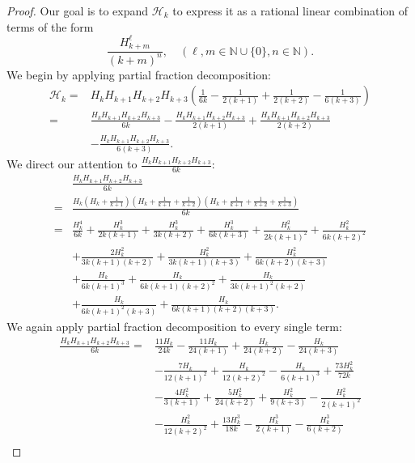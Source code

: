 \documentclass[10pt]{amsart}
\theoremstyle{definition}
\begin{document}
\begin{proof}
    Our goal is to expand $\mathscr{H}_k$ to express it as a rational linear combination of terms of the form $$\frac{H_{k+m}^\ell}{(k+m)^n}, \quad (\ell, m \in \mathbb{N}\cup\{0\}, n \in \mathbb{N}).$$
    We begin by applying partial fraction decomposition:
    \begin{align*}
        \mathscr{H}_k
        =& H_k H_{k+1} H_{k+2} H_{k+3}\left(\frac{1}{6 k} - \frac{1}{2 (k+1)} + \frac{1}{2 (k+2)} - \frac{1}{6 (k+3)}\right)\\
        =& \frac{H_k H_{k+1} H_{k+2} H_{k+3}}{6k} - \frac{H_k H_{k+1} H_{k+2} H_{k+3}}{2 (k+1)} + \frac{H_k H_{k+1} H_{k+2} H_{k+3}}{2 (k+2)}\\
        &- \frac{H_k H_{k+1} H_{k+2} H_{k+3}}{6 (k+3)}.
    \end{align*}
    We direct our attention to $\frac{H_k H_{k+1} H_{k+2} H_{k+3}}{6k}$:
    \begin{align*}
        &\frac{H_k H_{k+1} H_{k+2} H_{k+3}}{6k}\\
        =& \frac{H_k\left(H_k + \frac{1}{k+1}\right)\left(H_k + \frac{1}{k+1} + \frac{1}{k+2}\right)\left(H_k + \frac{1}{k+1} + \frac{1}{k+2} + \frac{1}{k+3}\right)}{6k}\\
        =& \frac{H_k^4}{6 k} + \frac{H_k^3}{2 k (k+1)} +  \frac{H_k^3}{3 k (k+2)} +  \frac{H_k^3}{6 k (k+3)} + \frac{H_k^2}{2k (k+1)^2} + \frac{H_k^2}{6k (k+2)^2}\\
        &+ \frac{2 H_k^2}{3 k (k+1)(k+2)} + \frac{H_k^2}{3 k (k+1)(k+3)} + \frac{H_k^2}{6 k (k+2)(k+3)}\\
        &+ \frac{H_k}{6 k (k+1)^3} + \frac{H_k}{6k (k+1)(k+2)^2} + \frac{H_k}{3k (k+1)^2 (k+2)}\\
        & +\frac{H_k}{6k (k+1)^2 (k+3)}+ \frac{H_k}{6 k(k+1)(k+2)(k+3)}.
    \end{align*}
    We again apply partial fraction decomposition to every single term:
    \begin{align*}
        \frac{H_k H_{k+1} H_{k+2} H_{k+3}}{6k}
        =& \frac{11 H_k}{24 k}-\frac{11 H_k}{24 (k+1)} +\frac{H_k}{24 (k+2)} -\frac{H_k}{24 (k+3)}\\
        &-\frac{7 H_k}{12 (k+1)^2}+\frac{H_k}{12 (k+2)^2} -\frac{H_k}{6 (k+1)^3} +\frac{73 H_k^2}{72 k}\\
        &-\frac{4 H_k^2}{3 (k+1)}+\frac{5 H_k^2}{24 (k+2)} +\frac{H_k^2}{9 (k+3)} -\frac{H_k^2}{2 (k+1)^2}\\
        &-\frac{H_k^2}{12 (k+2)^2}+ \frac{13 H_k^3}{18 k}-\frac{H_k^3}{2 (k+1)}-\frac{H_k^3}{6 (k+2)}\\

\end{align*}
\end{proof}
\end{document}
